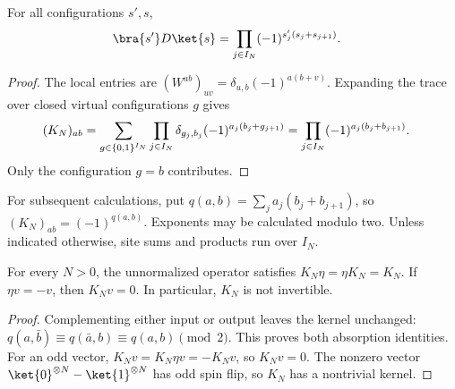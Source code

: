 \begin{lemma}
    \label{thm:asymex_kw_kernel}
    \leanok

    For all configurations $s',s$,
    \begin{align}
        \bra{s'}D\ket{s}
         & =\prod_{j\in I_N}(-1)^{s'_j(s_j+s_{j+1})}.
        \label{eq:asymex_kw_kernel}
    \end{align}
\end{lemma}

\begin{proof}
    \leanok
    The local entries are $(W^{ab})_{uv}=\delta_{u,b}(-1)^{a(b+v)}$.
    Expanding the trace over closed virtual configurations $g$ gives
    \begin{align}
        (K_N)_{ab}
         & =\sum_{g\in\{0,1\}^{I_N}}
        \prod_{j\in I_N}\delta_{g_j,b_j}
        (-1)^{a_j(b_j+g_{j+1})}
        =\prod_{j\in I_N}(-1)^{a_j(b_j+b_{j+1})}.
        \notag
    \end{align}
    Only the configuration $g=b$ contributes.
\end{proof}

For subsequent calculations, put $q(a,b)=\sum_j a_j(b_j+b_{j+1})$,
so $(K_N)_{ab}=(-1)^{q(a,b)}$. Exponents may be calculated modulo two.
Unless indicated otherwise, site sums and products run over $I_N$.

\begin{lemma}
    \label{thm:asymex_kw_absorption}
    \leanok
    For every $N>0$, the unnormalized operator satisfies
    $K_N\eta=\eta K_N=K_N$. If $\eta v=-v$, then $K_Nv=0$.
    In particular, $K_N$ is not invertible.
\end{lemma}
\begin{proof}
    \leanok
    Complementing either input or output leaves the kernel unchanged:
    $q(a,\bar b)\equiv q(\bar a,b)\equiv q(a,b)\pmod2$.
    This proves both absorption identities. For an odd vector,
    $K_Nv=K_N\eta v=-K_Nv$, so $K_Nv=0$.
    The nonzero vector $\ket{0}^{\otimes N}-\ket{1}^{\otimes N}$
    has odd spin flip, so $K_N$ has a nontrivial kernel.
\end{proof}

